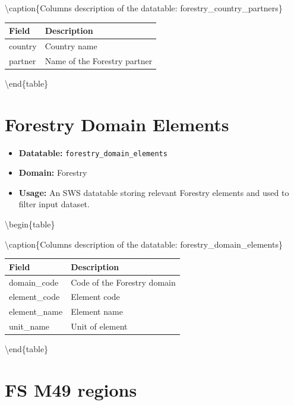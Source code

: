 \documentclass[
]{book}
\providecommand{\tightlist}{%
  \setlength{\itemsep}{0pt}\setlength{\parskip}{0pt}}
\begin{document}
\textbackslash caption\{\label{tab:forestrycountrypartners}Columns description of the datatable: forestry\_country\_partners\}
\centering
\fontsize{14}{16}\selectfont

\begin{tabular}[t]{l|l}
\hline
\rowcolor[HTML]{a9c9a7}  Field & Description\\
\hline
country & Country name\\
\hline
partner & Name of the Forestry partner\\
\hline
\end{tabular}

\textbackslash end\{table\}

\hypertarget{forestry-domain-elements}{%
\section*{Forestry Domain Elements}\label{forestry-domain-elements}}

\begin{itemize}
\tightlist
\item
  \textbf{Datatable:} \texttt{forestry\_domain\_elements}
\item
  \textbf{Domain:} Forestry
\item
  \textbf{Usage:} An SWS datatable storing relevant Forestry elements and used to filter input dataset.
\end{itemize}

\textbackslash begin\{table\}

\textbackslash caption\{\label{tab:forestrydomainelements}Columns description of the datatable: forestry\_domain\_elements\}
\centering
\fontsize{14}{16}\selectfont

\begin{tabular}[t]{l|l}
\hline
\rowcolor[HTML]{a9c9a7}  Field & Description\\
\hline
domain\_code & Code of the Forestry domain\\
\hline
element\_code & Element code\\
\hline
element\_name & Element name\\
\hline
unit\_name & Unit of element\\
\hline
\end{tabular}

\textbackslash end\{table\}

\hypertarget{fs-m49-regions}{%
\section*{FS M49 regions}\label{fs-m49-regions}}
\end{document}

